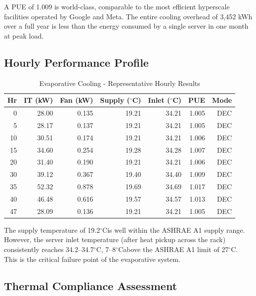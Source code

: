 ﻿\documentclass[12pt,a4paper]{report}
\newcommand{\degC}{$^{\circ}$C}
\begin{document}
A PUE of 1.009 is world-class, comparable to the most efficient hyperscale facilities
operated by Google and Meta. The entire cooling overhead of 3{,}452 kWh over a full year
is less than the energy consumed by a single server in one month at peak load.

\subsection{Hourly Performance Profile}

\begin{table}[H]
\centering
\caption{Evaporative Cooling - Representative Hourly Results}
\label{tab:evap_hourly}
\renewcommand{\arraystretch}{1.25}
\begin{tabular}{rrrrrrr}
\toprule
\textbf{Hr} & \textbf{IT (kW)} & \textbf{Fan (kW)} & \textbf{Supply (\degC)} & \textbf{Inlet (\degC)} & \textbf{PUE} & \textbf{Mode} \\
\midrule
0  & 28.00 & 0.135 & 19.21 & 34.21 & 1.005 & DEC \\
5  & 28.17 & 0.137 & 19.21 & 34.21 & 1.005 & DEC \\
10 & 30.51 & 0.174 & 19.21 & 34.21 & 1.006 & DEC \\
15 & 34.60 & 0.254 & 19.28 & 34.28 & 1.007 & DEC \\
20 & 31.40 & 0.190 & 19.21 & 34.21 & 1.006 & DEC \\
30 & 39.12 & 0.367 & 19.40 & 34.40 & 1.009 & DEC \\
35 & 52.32 & 0.878 & 19.69 & 34.69 & 1.017 & DEC \\
40 & 46.48 & 0.616 & 19.57 & 34.57 & 1.013 & DEC \\
47 & 28.09 & 0.136 & 19.21 & 34.21 & 1.005 & DEC \\
\bottomrule
\end{tabular}
\end{table}

\noindent The supply temperature of 19.2\degC is well within the ASHRAE A1 supply range.
However, the server inlet temperature (after heat pickup across the rack) consistently
reaches 34.2--34.7\degC, 7--8\degC above the ASHRAE A1 limit of 27\degC. This is
the critical failure point of the evaporative system.

\subsection{Thermal Compliance Assessment}
\end{document}
